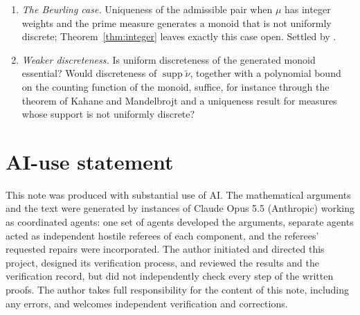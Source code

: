 \documentclass[11pt]{amsart}
\newcommand{\supp}{\operatorname{supp}}
\theoremstyle{definition}
\theoremstyle{remark}
\numberwithin{equation}{section}
\begin{document}
\begin{enumerate}[label=\textup{(\arabic*)}]
\item\label{op:Beurling} \emph{The Beurling case.} Uniqueness of the admissible pair when $\mu$ has integer weights and the prime
measure generates a monoid that is not uniformly discrete; Theorem~\ref{thm:integer} leaves exactly this case open. Settled by
\cite[Theorem~3.11]{PaperI}.
\item \emph{Weaker discreteness.} Is uniform discreteness of the generated monoid essential? Would discreteness of $\supp\tilde\nu$,
together with a polynomial bound on the counting function of the monoid, suffice, for instance through the theorem of Kahane
and Mandelbrojt \cite[Theorem~7]{KM58} and a uniqueness result for measures whose support is not uniformly discrete?
\end{enumerate}

\section*{AI-use statement}
This note was produced with substantial use of AI. The mathematical arguments and the text were generated by instances of Claude Opus 5.5
(Anthropic) working as coordinated agents: one set of agents developed the arguments, separate agents acted as
independent hostile referees of each component, and the referees' requested repairs were incorporated. The
author initiated and directed this project, designed its verification process, and reviewed the results and the
verification record, but did not independently check every step of the written proofs. The author takes full
responsibility for the content of this note, including any errors, and welcomes independent verification and
corrections.



\end{document}
